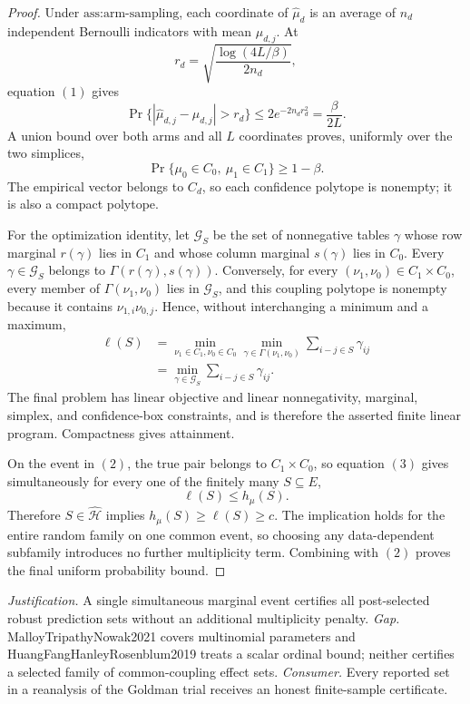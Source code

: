 \documentclass{article}
\begin{document}
\begin{proof}
Under \(\text{ass:arm-sampling}\), each coordinate of \(\widehat\mu_d\) is an average of \(n_d\) independent Bernoulli indicators with mean \(\mu_{d,j}\).  At
\[
r_d=\sqrt{\frac{\log(4L/\beta)}{2n_d}},
\]
equation \((1)\) gives
\[
\Pr\{|\widehat\mu_{d,j}-\mu_{d,j}|>r_d\}
\leq2e^{-2n_dr_d^2}=\frac{\beta}{2L}.
\]
A union bound over both arms and all \(L\) coordinates proves, uniformly over the two simplices,
\[
\Pr\{\mu_0\in C_0,\ \mu_1\in C_1\}\geq1-\beta. \tag{2}
\]
The empirical vector belongs to \(C_d\), so each confidence polytope is nonempty; it is also a compact polytope.

For the optimization identity, let \(\mathcal G_S\) be the set of nonnegative tables \(\gamma\) whose row marginal \(r(\gamma)\) lies in \(C_1\) and whose column marginal \(s(\gamma)\) lies in \(C_0\).  Every \(\gamma\in\mathcal G_S\) belongs to \(\Gamma(r(\gamma),s(\gamma))\).  Conversely, for every \((\nu_1,\nu_0)\in C_1\times C_0\), every member of \(\Gamma(\nu_1,\nu_0)\) lies in \(\mathcal G_S\), and this coupling polytope is nonempty because it contains \(\nu_{1,i}\nu_{0,j}\).  Hence, without interchanging a minimum and a maximum,
\[
\begin{aligned}
\ell(S)
&=\min_{\nu_1\in C_1,\nu_0\in C_0}
\min_{\gamma\in\Gamma(\nu_1,\nu_0)}
\sum_{i-j\in S}\gamma_{ij}\\
&=\min_{\gamma\in\mathcal G_S}\sum_{i-j\in S}\gamma_{ij}.
\end{aligned} \tag{3}
\]
The final problem has linear objective and linear nonnegativity, marginal, simplex, and confidence-box constraints, and is therefore the asserted finite linear program.  Compactness gives attainment.

On the event in \((2)\), the true pair belongs to \(C_1\times C_0\), so equation \((3)\) gives simultaneously for every one of the finitely many \(S\subseteq E\),
\[
\ell(S)\leq h_{\mu}(S).
\]
Therefore \(S\in\widehat{\mathcal H}\) implies \(h_{\mu}(S)\geq\ell(S)\geq c\).  The implication holds for the entire random family on one common event, so choosing any data-dependent subfamily introduces no further multiplicity term.  Combining with \((2)\) proves the final uniform probability bound.
\end{proof}
\par\smallskip\noindent \textit{Justification.} A single simultaneous marginal event certifies all post-selected robust prediction sets without an additional multiplicity penalty. \textit{Gap.} MalloyTripathyNowak2021 covers multinomial parameters and HuangFangHanleyRosenblum2019 treats a scalar ordinal bound; neither certifies a selected family of common-coupling effect sets. \textit{Consumer.} Every reported set in a reanalysis of the Goldman trial receives an honest finite-sample certificate.
\end{document}
